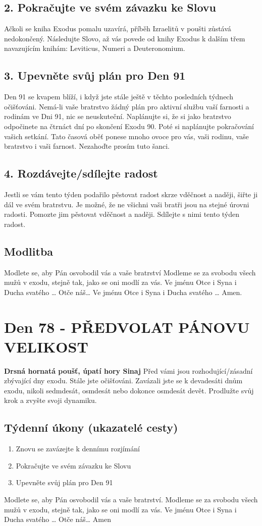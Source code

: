\documentclass[11pt]{article}
\newcommand{\zacatekDvanactyTyden}{
\textbf{Drsná hornatá poušť, úpatí hory Sinaj} \newline 
Před vámi jsou rozhodující/zásadní zbývající dny exodu. Stále jste očišťováni. Zavázali jste se k devadesáti dnům exodu, nikoli sedmdesát, osmdesát nebo dokonce osmdesát devět. Prodlužte svůj krok a zvyšte svoji dynamiku.

\subsection*{Týdenní úkony (ukazatelé cesty)}
\begin{enumerate}
  \item Znovu se zavázejte k dennímu rozjímání
  \item Pokračujte ve svém závazku ke Slovu
  \item Upevněte svůj plán pro Den 91
\end{enumerate}
Modlete se, aby Pán osvobodil vás a vaše bratrství. \newline
Modleme se za svobodu všech mužů v exodu, stejně tak, jako se oni modlí za vás.\newline
Ve jménu Otce i Syna i Ducha svatého …  Otče náš… Amen
}
\begin{document}
\subsection*{2. Pokračujte ve svém závazku ke Slovu}
Ačkoli se kniha Exodus pomalu uzavírá, příběh Izraelitů v poušti zůstává nedokončený. Následujte Slovo, až vás povede od knihy Exodus k dalším třem navazujícím knihám: Leviticus, Numeri a Deuteronomium.
\subsection*{3. Upevněte svůj plán pro Den 91}
Den 91 se kvapem blíží, i když jste stále ještě v těchto posledních týdnech očišťováni. Nemá-li vaše bratrstvo žádný plán pro aktivní službu vaší farnosti a rodinám ve Dni 91, nic se neuskuteční. Naplánujte si, že si jako bratrstvo odpočinete na čtrnáct dní po skončení Exodu 90. Poté si naplánujte pokračování vašich setkání. Tato časová oběť ponese mnoho ovoce pro vás, vaši rodinu, vaše bratrstvo i vaši farnost. Nezahoďte prosím tuto šanci.
\subsection*{4. Rozdávejte/sdílejte radost}
Jestli se vám tento týden podařilo pěstovat radost skrze vděčnost a naději, šiřte ji dál ve svém bratrstvu. Je možné, že ne všichni vaši bratři jsou na stejné úrovni radosti. Pomozte jim pěstovat vděčnost a naději. Sdílejte s nimi tento týden radost.
\subsection*{Modlitba}
Modlete se, aby Pán osvobodil vás a vaše bratrství \newline
Modleme se za svobodu všech mužů v exodu, stejně tak, jako se oni modlí za vás.\newline
Ve jménu Otce i Syna i Ducha svatého … Otče náš… Ve jménu Otce i Syna i Ducha svatého … Amen.
\newpage

\newpage
\section{Den 78 - PŘEDVOLAT PÁNOVU VELIKOST}
\zacatekDvanactyTyden
\end{document}
